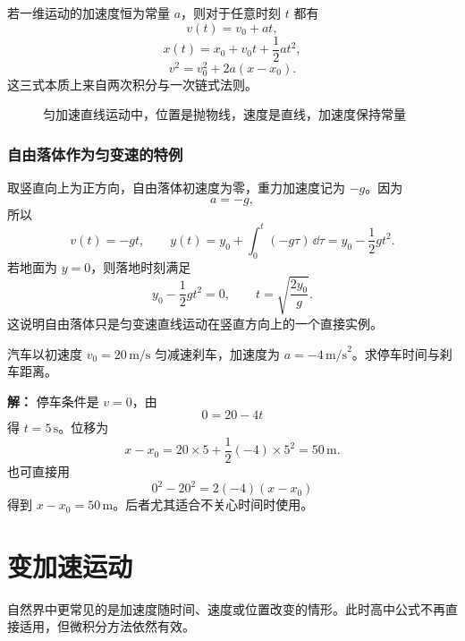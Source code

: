 \begin{theorem}[匀变速直线运动公式]
若一维运动的加速度恒为常量 $a$，则对于任意时刻 $t$ 都有
\[
 v(t)=v_0+at,
\]
\[
 x(t)=x_0+v_0 t+\frac12 at^2,
\]
\[
 v^2=v_0^2+2a(x-x_0).
\]
这三式本质上来自两次积分与一次链式法则。
\end{theorem}

\begin{figure}[htbp]
\centering
{}
\caption{匀加速直线运动中，位置是抛物线，速度是直线，加速度保持常量}
\end{figure}

\subsubsection*{自由落体作为匀变速的特例}
取竖直向上为正方向，自由落体初速度为零，重力加速度记为 $-g$。因为
\[
 a=-g,
\]
所以
\[
 v(t)=-gt,
\qquad
 y(t)=y_0+\int_0^t (-g\tau)\,\dd \tau=y_0-\frac12 gt^2.
\]
若地面为 $y=0$，则落地时刻满足
\[
 y_0-\frac12 gt^2=0,
\qquad
 t=\sqrt{\frac{2y_0}{g}}.
\]
这说明自由落体只是匀变速直线运动在竖直方向上的一个直接实例。

\begin{example}[汽车刹车]
汽车以初速度 $v_0=20\,\text{m/s}$ 匀减速刹车，加速度为 $a=-4\,\text{m/s}^2$。求停车时间与刹车距离。

\textbf{解：}
停车条件是 $v=0$，由
\[
 0=20-4t
\]
得 $t=5\,\text{s}$。位移为
\[
 x-x_0=20\times 5+\frac12(-4)\times 5^2=50\,\text{m}.
\]
也可直接用
\[
 0^2-20^2=2(-4)(x-x_0)
\]
得到 $x-x_0=50\,\text{m}$。后者尤其适合不关心时间时使用。
\end{example}

\section{变加速运动}

自然界中更常见的是加速度随时间、速度或位置改变的情形。此时高中公式不再直接适用，但微积分方法依然有效。

